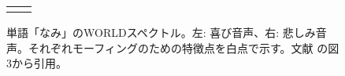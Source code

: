 
\begin{figure}[t]

  \begin{tabular}{cc}
  \begin{minipage} {0.47\hsize}
  \centering
  \includegraphics [ width = 1\columnwidth]{Figure/ExpAngHapSad/Fig_nami_hap_Spect.eps}
  \end{minipage} & 
  
  \begin{minipage} {0.47\hsize}
  \centering
  \includegraphics [ width = 1\columnwidth]{Figure/ExpAngHapSad/Fig_nami_sad_Spect.eps }
  \end{minipage}
  
  \end{tabular}
  
  \caption{単語「なみ」のWORLDスペクトル。左: 喜び音声、右: 悲しみ音声。それぞれモーフィングのための特徴点を白点で示す。文献 \cite{hanatani2024onsei}の図3から引用。}
  
  \label{fig:MorphingAligner} 

\end{figure}

